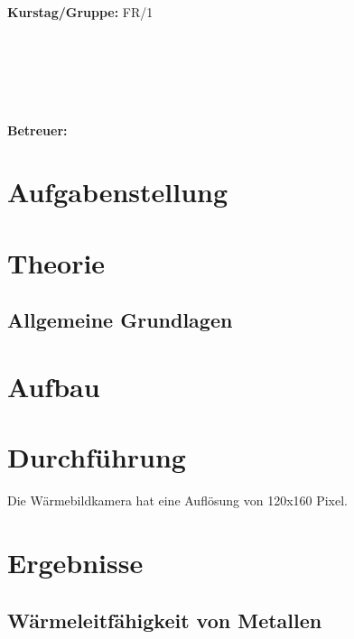 \documentclass[12pt,a4paper,twopage]{article}
\begin{document}
\begin{verbatim}


\end{verbatim}
			\begin{flushleft}
			\textbf{\Large{Kurstag/Gruppe:}} \Large{FR/1}
			\end{flushleft}

\begin{verbatim}






\end{verbatim}
			\begin{flushleft}
			\LARGE{\textbf{Betreuer:\Large{ }}}		
			\end{flushleft}
			
\section{Aufgabenstellung}

\section{Theorie}
\subsection{Allgemeine Grundlagen}


\section{Aufbau}

\section{Durchführung}
Die Wärmebildkamera hat eine Auflösung von 120x160 Pixel.

\section{Ergebnisse}
\subsection{Wärmeleitfähigkeit von Metallen}
\end{document}
